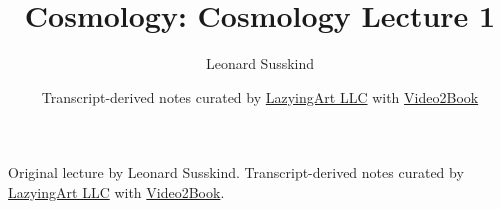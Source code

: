 \documentclass[11pt,oneside]{book}
\begin{document}
\frontmatter
\title{Cosmology: Cosmology Lecture 1}
\author{Leonard Susskind}
\date{Transcript-derived notes curated by \href{https://lazying.art}{LazyingArt LLC} with \href{https://github.com/lachlanchen/Video2Book}{Video2Book}}
\maketitle
\begin{center}
\small Original lecture by Leonard Susskind. Transcript-derived notes curated by \href{https://lazying.art}{LazyingArt LLC} with \href{https://github.com/lachlanchen/Video2Book}{Video2Book}.
\end{center}
\clearpage
\mainmatter

\end{document}
